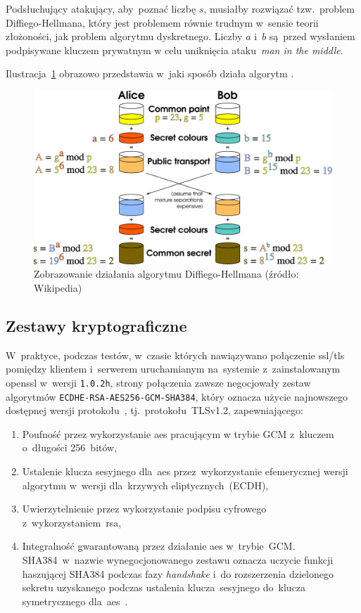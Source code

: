 \documentclass[thesis]{subfiles}
\begin{document}
Podsłuchujący atakujący, aby~poznać liczbę $s$, musiałby rozwiązać tzw.~problem Diffiego-Hellmana, który jest problemem równie trudnym w~sensie teorii złożoności, jak problem algorytmu dyskretnego. Liczby $a$ i~$b$ są~przed wysłaniem podpisywane kluczem prywatnym w celu uniknięcia ataku~\emph{man in the middle}.

Ilustracja~\ref{fig:dh} obrazowo przedstawia w~jaki sposób działa algorytm .

\begin{figure}
	\centering
	\includegraphics[width=\textwidth]{img/Diffie-Hellman_Key_Exchange_desc}
	\caption{Zobrazowanie działania algorytmu Diffiego-Hellmana (źródło: Wikipedia)}
	\label{fig:dh}
\end{figure}


\subsection{Zestawy kryptograficzne}

W~praktyce, podczas testów, w~czasie których nawiązywano połączenie \gls{ssl/tls} pomiędzy klientem i~serwerem uruchamianym na~systemie z~zainstalowanym \gls{openssl} w~wersji \texttt{1.0.2h}, strony połączenia zawsze negocjowały zestaw algorytmów \texttt{ECDHE-RSA-AES256-GCM-SHA384}, który oznacza użycie najnowszego dostępnej wersji protokołu~, tj.~protokołu~TLSv1.2, zapewniającego:
\begin{enumerate}
\item Poufność przez wykorzystanie \gls{aes} pracującym w trybie GCM z~kluczem o~długości 256~bitów,
\item Ustalenie klucza sesyjnego dla~\gls{aes} przez~wykorzystanie efemerycznej wersji algorytmu  w~wersji dla~krzywych eliptycznych~(ECDH),
\item Uwierzytelnienie przez wykorzystanie podpisu cyfrowego z~wykorzystaniem~\gls{rsa},
\item Integralność gwarantowaną przez działanie \gls{aes} w~trybie~GCM. SHA384~w~nazwie wynegocjonowanego zestawu oznacza uczycie funkcji haszującej SHA384 podczas fazy \emph{handshake} i~do rozszerzenia dzielonego sekretu uzyskanego podczas ustalenia klucza~sesyjnego do~klucza symetrycznego dla~\gls{aes}~\cite{stack:openssl-sha-gcm}.
\end{enumerate}
\end{document}
